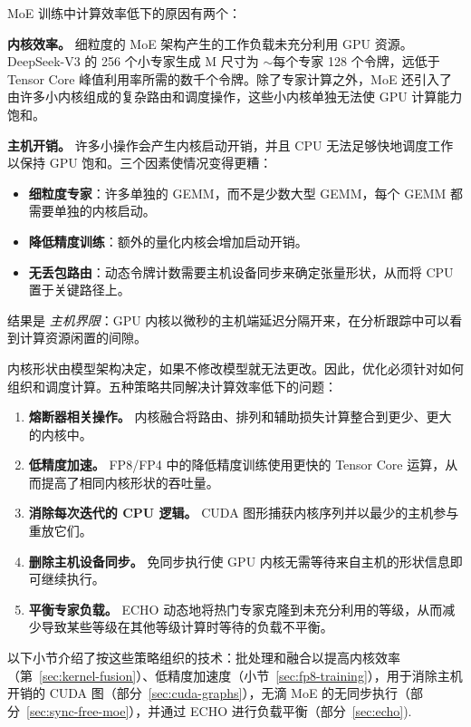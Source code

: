\documentclass[10pt,logo,copyright]{nvidiatechreport_zh}
\begin{document}
MoE 训练中计算效率低下的原因有两个：

\textbf{内核效率。} 细粒度的 MoE 架构产生的工作负载未充分利用 GPU 资源。 DeepSeek-V3 的 256 个小专家生成 M 尺寸为 $\sim$每个专家 128 个令牌，远低于 Tensor Core 峰值利用率所需的数千个令牌。除了专家计算之外，MoE 还引入了由许多小内核组成的复杂路由和调度操作，这些小内核单独无法使 GPU 计算能力饱和。

\textbf{主机开销。} 许多小操作会产生内核启动开销，并且 CPU 无法足够快地调度工作以保持 GPU 饱和。三个因素使情况变得更糟：
\begin{itemize}
    \item \textbf{细粒度专家}：许多单独的 GEMM，而不是少数大型 GEMM，每个 GEMM 都需要单独的内核启动。
    \item \textbf{降低精度训练}：额外的量化内核会增加启动开销。
    \item \textbf{无丢包路由}：动态令牌计数需要主机设备同步来确定张量形状，从而将 CPU 置于关键路径上。
\end{itemize}

结果是 \textit{主机界限}：GPU 内核以微秒的主机端延迟分隔开来，在分析跟踪中可以看到计算资源闲置的间隙。

内核形状由模型架构决定，如果不修改模型就无法更改。因此，优化必须针对如何组织和调度计算。五种策略共同解决计算效率低下的问题：

\begin{enumerate}
    \item \textbf{熔断器相关操作。} 内核融合将路由、排列和辅助损失计算整合到更少、更大的内核中。
    \item \textbf{低精度加速。} FP8/FP4 中的降低精度训练使用更快的 Tensor Core 运算，从而提高了相同内核形状的吞吐量。
    \item \textbf{消除每次迭代的 CPU 逻辑。} CUDA 图形捕获内核序列并以最少的主机参与重放它们。
    \item \textbf{删除主机设备同步。} 免同步执行使 GPU 内核无需等待来自主机的形状信息即可继续执行。
    \item \textbf{平衡专家负载。} ECHO 动态地将热门专家克隆到未充分利用的等级，从而减少导致某些等级在其他等级计算时等待的负载不平衡。
\end{enumerate}

以下小节介绍了按这些策略组织的技术：批处理和融合以提高内核效率（第~\ref{sec:kernel-fusion}）、低精度加速度（小节~\ref{sec:fp8-training}），用于消除主机开销的 CUDA 图（部分~\ref{sec:cuda-graphs}），无滴 MoE 的无同步执行（部分~\ref{sec:sync-free-moe}），并通过 ECHO 进行负载平衡（部分~\ref{sec:echo}).
\end{document}
